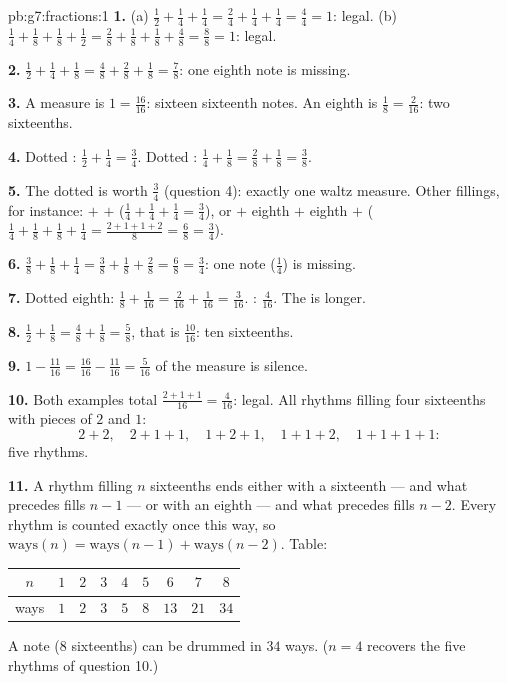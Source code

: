 \begin{solution}{pb:g7:fractions:1}
\textbf{1.} (a) $\frac12 + \frac14 + \frac14 = \frac24 + \frac14
+ \frac14 = \frac44 = 1$: legal. (b) $\frac14 + \frac18 +
\frac18 + \frac12 = \frac28 + \frac18 + \frac18 + \frac48 =
\frac88 = 1$: legal.

\textbf{2.} $\frac12 + \frac14 + \frac18 = \frac48 + \frac28 +
\frac18 = \frac78$: one eighth note is missing.

\textbf{3.} A measure is $1 = \frac{16}{16}$: sixteen sixteenth
notes. An eighth is $\frac18 = \frac{2}{16}$: two sixteenths.

\textbf{4.} Dotted : $\frac12 + \frac14 = \frac34$. Dotted
: $\frac14 + \frac18 = \frac28 + \frac18 = \frac38$.

\textbf{5.} The dotted  is worth $\frac34$ (question 4):
exactly one waltz measure. Other fillings, for instance: 
$+$  $+$  ($\frac14 + \frac14 + \frac14 =
\frac34$), or  $+$ eighth $+$ eighth $+$ 
($\frac14 + \frac18 + \frac18 + \frac14 = \frac{2 + 1 + 1 +
2}{8} = \frac68 = \frac34$).

\textbf{6.} $\frac38 + \frac18 + \frac14 = \frac38 + \frac18 +
\frac28 = \frac68 = \frac34$: one  note ($\frac14$) is
missing.

\textbf{7.} Dotted eighth: $\frac18 + \frac{1}{16} =
\frac{2}{16} + \frac{1}{16} = \frac{3}{16}$. :
$\frac{4}{16}$. The  is longer.

\textbf{8.} $\frac12 + \frac18 = \frac48 + \frac18 = \frac58$,
that is $\frac{10}{16}$: ten sixteenths.

\textbf{9.} $1 - \frac{11}{16} = \frac{16}{16} - \frac{11}{16}
= \frac{5}{16}$ of the measure is silence.

\textbf{10.} Both examples total $\frac{2 + 1 + 1}{16} =
\frac{4}{16}$: legal. All rhythms filling four sixteenths with
pieces of $2$ and $1$:
\[
2{+}2, \quad 2{+}1{+}1, \quad 1{+}2{+}1, \quad 1{+}1{+}2, \quad
1{+}1{+}1{+}1 :
\]
five rhythms.

\textbf{11.} A rhythm filling $n$ sixteenths ends either with a
sixteenth --- and what precedes fills $n - 1$ --- or with an
eighth --- and what precedes fills $n - 2$. Every rhythm is
counted exactly once this way, so
$\text{ways}(n) = \text{ways}(n-1) + \text{ways}(n-2)$. Table:
\begin{center}
\renewcommand{\arraystretch}{1.2}
\begin{tabular}{c|cccccccc}
$n$ & $1$ & $2$ & $3$ & $4$ & $5$ & $6$ & $7$ & $8$ \\
\hline
ways & $1$ & $2$ & $3$ & $5$ & $8$ & $13$ & $21$ & $34$ \\
\end{tabular}
\end{center}
A  note ($8$ sixteenths) can be drummed in $34$ ways.
($n = 4$ recovers the five rhythms of question 10.)


\end{solution}
